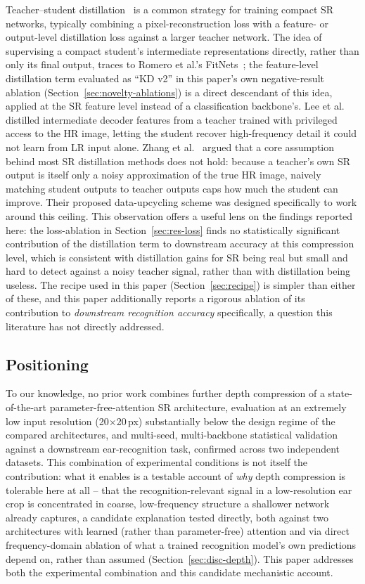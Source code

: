 \documentclass[11pt]{article}
\begin{document}
Teacher--student distillation~\cite{hinton2015distilling} is a common strategy for training compact SR networks, typically combining a pixel-reconstruction loss with a feature- or output-level distillation loss against a larger teacher network. The idea of supervising a compact student's intermediate representations directly, rather than only its final output, traces to Romero et al.'s FitNets~\cite{romero2015fitnets}; the feature-level distillation term evaluated as ``KD v2'' in this paper's own negative-result ablation (Section~\ref{sec:novelty-ablations}) is a direct descendant of this idea, applied at the SR feature level instead of a classification backbone's. Lee et al.~\cite{lee2020privileged} distilled intermediate decoder features from a teacher trained with privileged access to the HR image, letting the student recover high-frequency detail it could not learn from LR input alone. Zhang et al.~\cite{zhang2024dukd} argued that a core assumption behind most SR distillation methods does not hold: because a teacher's own SR output is itself only a noisy approximation of the true HR image, naively matching student outputs to teacher outputs caps how much the student can improve. Their proposed data-upcycling scheme was designed specifically to work around this ceiling. This observation offers a useful lens on the findings reported here: the loss-ablation in Section~\ref{sec:res-loss} finds no statistically significant contribution of the distillation term to downstream accuracy at this compression level, which is consistent with distillation gains for SR being real but small and hard to detect against a noisy teacher signal, rather than with distillation being useless. The recipe used in this paper (Section~\ref{sec:recipe}) is simpler than either of these, and this paper additionally reports a rigorous ablation of its contribution to \emph{downstream recognition accuracy} specifically, a question this literature has not directly addressed.

\subsection{Positioning}

To our knowledge, no prior work combines further depth compression of a state-of-the-art parameter-free-attention SR architecture, evaluation at an extremely low input resolution (20$\times$20\,px) substantially below the design regime of the compared architectures, and multi-seed, multi-backbone statistical validation against a downstream ear-recognition task, confirmed across two independent datasets. This combination of experimental conditions is not itself the contribution: what it enables is a testable account of \emph{why} depth compression is tolerable here at all -- that the recognition-relevant signal in a low-resolution ear crop is concentrated in coarse, low-frequency structure a shallower network already captures, a candidate explanation tested directly, both against two architectures with learned (rather than parameter-free) attention and via direct frequency-domain ablation of what a trained recognition model's own predictions depend on, rather than assumed (Section~\ref{sec:disc-depth}). This paper addresses both the experimental combination and this candidate mechanistic account.
\end{document}
